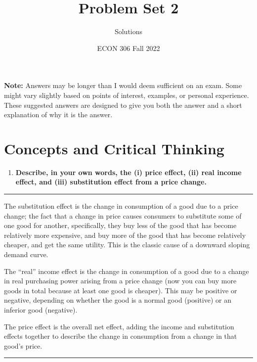 \documentclass[
  11pt,
]{article}
\title{Problem Set 2}
\author{Solutions}
\date{ECON 306 Fall 2022}
\providecommand{\tightlist}{%
  \setlength{\itemsep}{0pt}\setlength{\parskip}{0pt}}
\begin{document}
\maketitle

\textbf{Note:} Answers may be longer than I would deem sufficient on an
exam. Some might vary slightly based on points of interest, examples, or
personal experience. These suggested answers are designed to give you
both the answer and a short explanation of why it is the answer.

\hypertarget{concepts-and-critical-thinking}{%
\section{Concepts and Critical
Thinking}\label{concepts-and-critical-thinking}}

\begin{enumerate}
\def\labelenumi{\arabic{enumi}.}
\tightlist
\item
  \textbf{Describe, in your own words, the (i) price effect, (ii) real
  income effect, and (iii) substitution effect from a price change.}
\end{enumerate}

\begin{center}\rule{0.5\linewidth}{0.5pt}\end{center}

The substitution effect is the change in consumption of a good due to a
price change; the fact that a change in price causes consumers to
substitute some of one good for another, specifically, they buy less of
the good that has become relatively more expensive, and buy more of the
good that has become relatively cheaper, and get the same utility. This
is the classic cause of a downward sloping demand curve.

The ``real'' income effect is the change in consumption of a good due to
a change in real purchasing power arising from a price change (now you
can buy more goods in total because at least one good is cheaper). This
may be positive or negative, depending on whether the good is a normal
good (positive) or an inferior good (negative).

The price effect is the overall net effect, adding the income and
substitution effects together to describe the change in consumption from
a change in that good's price.

\begin{center}\rule{0.5\linewidth}{0.5pt}\end{center}
\end{document}
